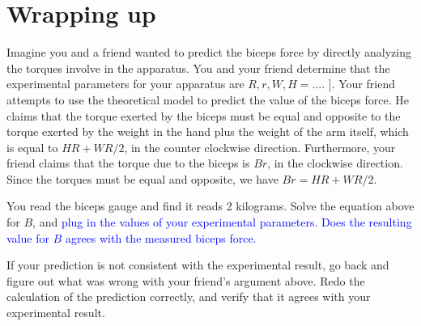 \documentclass[11pt,letterpaper]{article}
\newcommand{\question}[2][blue]{\textcolor{#1}{#2}}
\newcommand{\answer}[2][red]{\textcolor{#1}{#2}}
\newcommand{\yint}[1][]{vertical intercept\xspace}
\newcommand{\temp}[2][]{#1#2}
\begin{document}
\begin{comment}
You probably noticed some similarities between the previous steps.
Why do they seem so similar?  
Is there a relationship between the model parameters
and the slope and \yint  of your graph?
\answer{Since this is a linear model, the model parameters are precisely
	the slope and the \yint  of the graph.}
\end{comment}


\temp{\pagebreak}
\section*{Wrapping up}
\itemb
	\item 
		Imagine you and a friend wanted to predict the biceps force by 
		directly analyzing the torques involve in the apparatus.
		You and your friend determine that the experimental parameters for
		your apparatus are {$R,r,W,H=...$.  ]}.
		Your friend attempts to use the theoretical model
		to predict the value of the biceps force.
		He claims that the torque exerted by the biceps must be equal and 
		opposite to the torque exerted by the weight in the hand
		plus the weight of the arm itself, 
		which is equal to $H R + W R/2$, in the counter clockwise direction.
		Furthermore, your friend claims that the torque due to
		the biceps is $B r$, in the clockwise direction.
		Since the torques must be equal and opposite, we have
		$Br=HR+WR/2$.

		You read the biceps gauge and find it reads 2 kilograms.
		Solve the equation above for $B$, and 
		\question{plug in the values of your experimental parameters.
		Does the resulting value for $B$ agrees 
		with the measured biceps force.}

		If your prediction is not consistent with the experimental result, 
		go back and figure out what was wrong with your friend's argument
		above.  Redo the calculation of the prediction correctly,
		and verify that it agrees with your experimental result.
\end{document}
